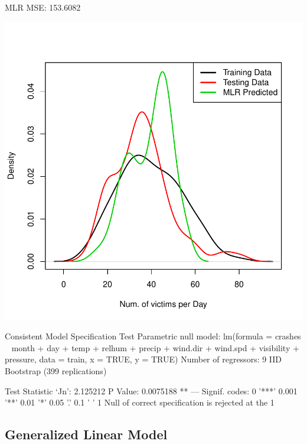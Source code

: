 \documentclass[11pt, a4paper]{article}
\begin{document}
\begin{Schunk}
\begin{Soutput}
MLR MSE: 153.6082
\end{Soutput}
\end{Schunk}
\includegraphics{regression-030}



\begin{Schunk}
\begin{Soutput}
Consistent Model Specification Test
Parametric null model: lm(formula = crashes ~ month + day + temp + relhum +
                          precip + wind.dir + wind.spd + visibility + pressure,
                          data = train, x = TRUE, y = TRUE)
Number of regressors: 9
IID Bootstrap (399 replications)

Test Statistic ‘Jn’: 2.125212	P Value: 0.0075188 **
---
Signif. codes:  0 '***' 0.001 '**' 0.01 '*' 0.05 '.' 0.1 ' ' 1
Null of correct specification is rejected at the 1%
\end{Soutput}
\end{Schunk}




\pagebreak
\subsection{Generalized Linear Model}
\end{document}
